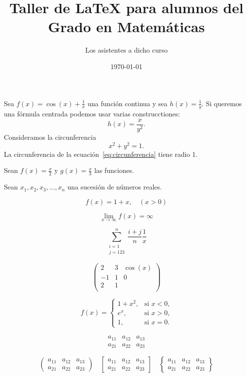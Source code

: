 \documentclass{article}
\title{Taller de \LaTeX{} para alumnos del Grado en Matemáticas}
\author{Los asistentes a dicho curso}
\date{\today}
\begin{document}
\maketitle

\tableofcontents
\bigskip

Sea $f(x)=\cos(x)+\frac{1}{x}$ una función continua y sea $h(x) = \frac{1}{y}$. Si queremos una fórmula centrada podemos usar varias construcctiones:
\[
    h(x) = \frac{x}{y^2} .
\]
Consideramos la circunferencia
\begin{equation} \label{eq:circunferencia}
    x^2 + y^2 = 1 .
\end{equation}
La circunferencia de la ecuación~\eqref{eq:circunferencia} tiene radio 1.

Sean $f(x)=\frac{x}{2}$ y $\displaystyle
g(x)=\frac{x}{3}$ las funciones.

Sean $x_{1},x_{2},x_{3},\dots, x_{n}$ una sucesión de números reales.

\[
f(x) = 1+x, \quad (x>0)
\]

\[
\lim_{x \to \infty} f(x) = \infty
\]

\[
\sum_{\substack{i=1\\j=123}}^{n} \dfrac{i+j}{n} \frac{1}{x}
\]

\[
  \left(
  \begin{array}{lc|r}  %
    2 & 3 & \cos(x) \\
    -1 & 1 & 0 \\
    2 & 1 &  \\
  \end{array}
  \right)
\]

\[
  f(x) =
  \begin{cases}
   1+x^2, & \text{si $x<0$,}\\
   e^x,  & \text{si $x>0$,}\\
   1, & \text{si $x=0$.}
\end{cases}
\]

\[
  \begin{matrix}
  a_{11} & a_{12} & a_{13} \\
  a_{21} & a_{22} & a_{23}
  \end{matrix}
\]

\[
  \begin{pmatrix}
  a_{11} & a_{12} & a_{13} \\
  a_{21} & a_{22} & a_{23}
  \end{pmatrix}
  \quad
  \begin{bmatrix}
  a_{11} & a_{12} & a_{13} \\
  a_{21} & a_{22} & a_{23}
  \end{bmatrix}
  \quad
  \begin{Bmatrix}
  a_{11} & a_{12} & a_{13} \\
  a_{21} & a_{22} & a_{23}
  \end{Bmatrix}
\]
\end{document}
